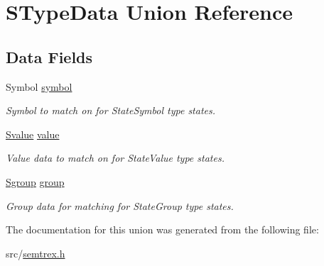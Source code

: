 \hypertarget{unionSTypeData}{\section{S\+Type\+Data Union Reference}
\label{unionSTypeData}
}
\subsection*{Data Fields}
\begin{DoxyCompactItemize}
\item 
\hypertarget{unionSTypeData_abff54fb9a7e4ab6d493e4615bf7293de}{Symbol \hyperlink{unionSTypeData_abff54fb9a7e4ab6d493e4615bf7293de}{symbol}}\label{unionSTypeData_abff54fb9a7e4ab6d493e4615bf7293de}

\begin{DoxyCompactList}\small\item\em Symbol to match on for State\+Symbol type states. \end{DoxyCompactList}\item 
\hypertarget{unionSTypeData_a78d1d47572bb172f00a6cdfb3917697b}{\hyperlink{structSvalue}{Svalue} \hyperlink{unionSTypeData_a78d1d47572bb172f00a6cdfb3917697b}{value}}\label{unionSTypeData_a78d1d47572bb172f00a6cdfb3917697b}

\begin{DoxyCompactList}\small\item\em Value data to match on for State\+Value type states. \end{DoxyCompactList}\item 
\hypertarget{unionSTypeData_a9c3c3d0e2cdadb4f98f5ddb3bb571176}{\hyperlink{structSgroup}{Sgroup} \hyperlink{unionSTypeData_a9c3c3d0e2cdadb4f98f5ddb3bb571176}{group}}\label{unionSTypeData_a9c3c3d0e2cdadb4f98f5ddb3bb571176}

\begin{DoxyCompactList}\small\item\em Group data for matching for State\+Group type states. \end{DoxyCompactList}\end{DoxyCompactItemize}


The documentation for this union was generated from the following file\+:\begin{DoxyCompactItemize}
\item 
src/\hyperlink{semtrex_8h}{semtrex.\+h}\end{DoxyCompactItemize}
